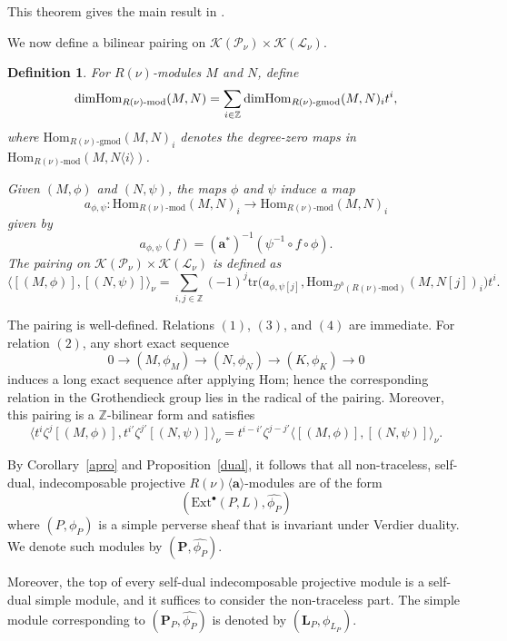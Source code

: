 \documentclass[10pt,a4paper]{amsart}
\newtheorem{definition}[theorem]{Definition}
\def\dim{\mbox{\rm dim}}   \def\End{\mbox{\rm End}}
\newcommand\mk{{\mathcal{K}}}
\newcommand\mP{{\mathcal{P}}}
\newcommand\ml{{\mathcal{L}}}
\begin{document}
This theorem gives the main result in \cite{https://doi.org/10.1112/jlms.12218}. 

We now define a bilinear pairing on $\mathcal{K}(\mathcal{P}_{\nu}) \times \mathcal{K}(\mathcal{L}_{\nu})$.

\begin{definition}
For $R(\nu)$-modules $M$ and $N$, define
\[
\dim \mathrm{Hom}_{R(\nu)\text{-}\mathrm{mod}}(M,N) = \sum_{i\in \mathbb{Z}} \dim \mathrm{Hom}_{R(\nu)\text{-}\mathrm{gmod}}(M,N)_i t^i,
\]
where $\mathrm{Hom}_{R(\nu)\text{-}\mathrm{gmod}}(M,N)_i$ denotes the degree-zero maps in $\mathrm{Hom}_{R(\nu)\text{-}\mathrm{mod}}(M,N\langle i\rangle)$.

Given $(M,\phi)$ and $(N,\psi)$, the maps $\phi$ and $\psi$ induce a map
\[
a_{\phi,\psi} : \mathrm{Hom}_{R(\nu)\text{-}\mathrm{mod}}(M,N)_i \to \mathrm{Hom}_{R(\nu)\text{-}\mathrm{mod}}(M,N)_i
\]
given by
\[
a_{\phi,\psi}(f) = (\mathbf{a}^*)^{-1}(\psi^{-1} \circ f \circ \phi).
\]
The pairing on $\mk(\mP_{\nu})\times \mk(\ml_{\nu})$ is defined as 
\[
\langle [(M,\phi)], [(N,\psi)] \rangle_{\nu} = \sum_{i,j \in \mathbb{Z}} (-1)^j \mathrm{tr}\bigl(a_{\phi,\psi[j]}, \mathrm{Hom}_{\mathcal{D}^{b}(R(\nu)\text{-}\mathrm{mod})}(M,N[j])_i\bigr) t^i.
\]
\end{definition}

The pairing is well-defined. Relations $(1)$, $(3)$, and $(4)$ are immediate. For relation $(2)$, any short exact sequence
\[
0 \to (M,\phi_M) \to (N,\phi_N) \to (K,\phi_K) \to 0
\]
induces a long exact sequence after applying $\mathrm{Hom}$; hence the corresponding relation in the Grothendieck group lies in the radical of the pairing. Moreover, this pairing is a $\mathbb{Z}$-bilinear form and satisfies
\[
\langle t^i \zeta^j [(M,\phi)], t^{i'} \zeta^{j'} [(N,\psi)] \rangle_{\nu} = t^{i - i'} \zeta^{j - j'} \langle [(M,\phi)], [(N,\psi)] \rangle_{\nu}.
\]

By Corollary~\ref{apro} and Proposition~\ref{dual}, it follows that all non-traceless, self-dual, indecomposable projective $R(\nu)\langle\mathbf{a}\rangle$-modules are of the form
\[
(\mathrm{Ext}^{\bullet}(P, L), \hat{\phi_P})
\]
where $(P,\phi_P)$ is a simple perverse sheaf that is invariant under Verdier duality. We denote such modules by $(\mathbf{P}, \hat{\phi_P})$.

Moreover, the top of every self-dual indecomposable projective module is a self-dual simple module, and it suffices to consider the non-traceless part. The simple module corresponding to $(\mathbf{P}_P,\hat{\phi_P})$ is denoted by $(\mathbf{L}_P,\phi_{L_P})$.
\end{document}
